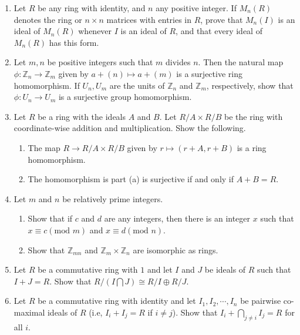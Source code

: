\documentclass{article}
\theoremstyle{definition}
\newcommand{\m}[1]{(\text{mod }{#1})}
\newcommand{\Z}{\mathbb{Z}}
\begin{document}
\begin{enumerate}
            \item Let $R$ be any ring with identity, and $n$ any positive integer. If $M_n(R)$ denotes the ring or $n\times n$ matrices with entries in $R$, prove that $M_n(I)$ is an ideal of $M_n(R)$ whenever $I$ is an ideal of $R$, and that every ideal of $M_n(R)$ has this form.
            
            \item Let $m,n$ be positive integers such that $m$ divides $n$. Then the natural map $\phi:\mathbb{Z}_n \to \mathbb{Z}_m$ given by $a+(n) \mapsto a+(m)$ is a surjective ring homomorphism. If $U_n,U_m$ are the units of $\mathbb{Z}_n$ and $\mathbb{Z}_m$, respectively, show that $\phi:U_n\to U_m$ is a surjective group homomorphism.
            
            \item Let $R$ be a ring with the ideals $A$ and $B$. Let $R/A\times R/B$ be the ring with coordinate-wise addition and multiplication. Show the following.
            
            \begin{enumerate}
                \item The map $R\to R/A\times R/B$ given by $r\mapsto (r+A,r+B)$ is a ring homomorphism. 
                \item The homomorphism is part (a) is surjective if and only if $A+B=R$.
            \end{enumerate}

            \item Let $m$ and $n$ be relatively prime integers. 
            
            \begin{enumerate}
                \item Show that if $c$ and $d$ are any integers, then there is an integer $x$ such that $x\equiv c \m{m}$ and $x\equiv d \m{n}$.
                \item Show that $\Z_{mn}$ and $\Z_m \times \Z_n$ are isomorphic as rings.
            \end{enumerate}

            \item Let $R$ be a commutative ring with $1$ and let $I$ and $J$ be ideals of $R$ such that $I+J=R$. Show that $R/(I\bigcap J) \cong R/I \oplus R/J$.
            
            \item Let $R$ be a commutative ring with identity and let $I_1, I_2, \dotsb , I_n$ be pairwise co-maximal ideals of $R$ (i.e, $I_i+I_j=R$ if $i\neq j$). Show that $I_i+\bigcap_{j\neq i} I_j=R$ for all $i$.
            

\end{enumerate}
\end{document}
